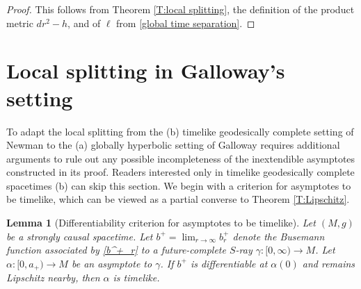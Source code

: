 \documentclass[12pt]{amsart}
\newtheorem{lemma}[theorem]{Lemma}
\begin{document}
\begin{proof}
This follows from Theorem \ref{T:local splitting}, the definition of the product metric $dr^2-h$, and of $\ell$ from \eqref{global time separation}.
\end{proof}


\section{Local splitting in Galloway's setting}

To adapt the local splitting from the 
(b) timelike geodesically complete setting of Newman \cite{Newman90}
to the (a) globally hyperbolic setting of Galloway \cite{Galloway89} requires additional arguments
to rule out any possible incompleteness of the inextendible
asymptotes constructed in its proof.  Readers interested only
in timelike geodesically complete spacetimes (b) can skip this section.  We begin with a criterion for asymptotes to be timelike, which can be viewed as a partial converse to Theorem \ref{T:Lipschitz}.


\begin{lemma}[Differentiability criterion for asymptotes to be timelike]
\label{L:timelike}
Let $(M,g)$ be a strongly causal
spacetime.
Let $b^+=\lim_{r \to \infty} b^+_r$ denote the Busemann function associated by \eqref{b^+_r} to a future-complete $S$-ray $\gamma:[0,\infty)\longrightarrow M$.
Let $\alpha:[0,a_+)\longrightarrow M$ be an asymptote to $\gamma$.
If $b^+$ is differentiable at $\alpha(0)$ and remains Lipschitz nearby,
then $\alpha$ is timelike.
\end{lemma}
\end{document}
